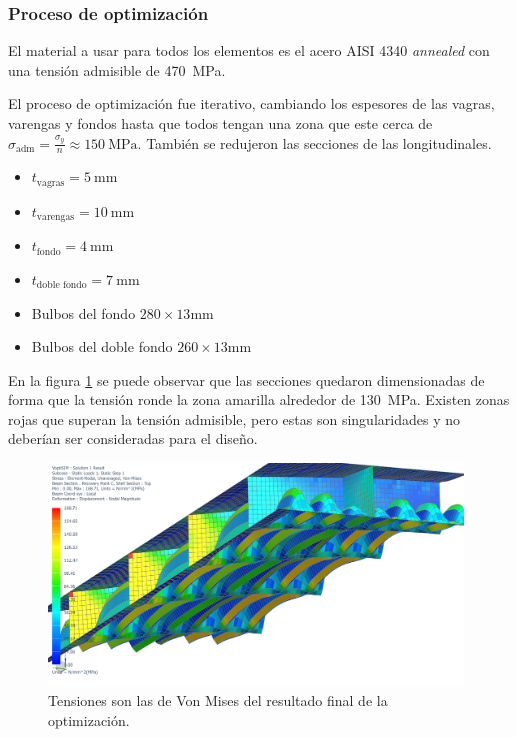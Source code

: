 \documentclass[onecolumn,10pt,titlepage]{article}
\newcommand{\adm}{\textrm{adm}}
\begin{document}
\subsubsection*{Proceso de optimización}
El material a usar para todos los elementos es el acero AISI 4340 \emph{annealed} con una tensión admisible de \SI{470}{\mega \pascal}.

El proceso de optimización fue iterativo, cambiando los espesores de las vagras, varengas y fondos hasta que todos tengan una zona que este cerca de $\sigma_{\adm}=\frac{\sigma_{y}}{n}\approx\SI{150}{\mega \pascal}$. También se redujeron las secciones de las longitudinales.
\begin{itemize}
	\item $t_{\textrm{vagras}}=\SI{5}{\milli \meter}$
	\item $t_{\textrm{varengas}}=\SI{10}{\milli \meter}$
	\item $t_{\textrm{fondo}}=\SI{4}{\milli \meter}$
	\item $t_{\textrm{doble fondo}}=\SI{7}{\milli \meter}$
	\item Bulbos del fondo $280\times 13$\si{\milli \meter}
	\item Bulbos del doble fondo $260\times 13$\si{\milli \meter}
\end{itemize}

En la figura \ref{fig:optimizacion} se puede observar que las secciones quedaron dimensionadas de forma que la tensión ronde la zona amarilla alrededor de \SI{130}{\mega\pascal}. Existen zonas rojas que superan la tensión admisible, pero estas son singularidades y no deberían ser consideradas para el diseño.

 \begin{figure}
     \centering
     \includegraphics[draft,width=11cm]{fig/VoptiSIM.png}
     \caption{Tensiones son las de Von Mises del resultado final de la optimización.}
     \label{fig:optimizacion}
 \end{figure}
\end{document}
